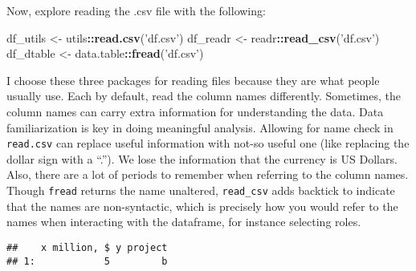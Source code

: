 \documentclass[]{book}
\newenvironment{Shaded}{\begin{snugshade}}{\end{snugshade}}
\newcommand{\DataTypeTok}[1]{\textcolor[rgb]{0.13,0.29,0.53}{#1}}
\newcommand{\DecValTok}[1]{\textcolor[rgb]{0.00,0.00,0.81}{#1}}
\newcommand{\KeywordTok}[1]{\textcolor[rgb]{0.13,0.29,0.53}{\textbf{#1}}}
\newcommand{\NormalTok}[1]{#1}
\newcommand{\OperatorTok}[1]{\textcolor[rgb]{0.81,0.36,0.00}{\textbf{#1}}}
\newcommand{\StringTok}[1]{\textcolor[rgb]{0.31,0.60,0.02}{#1}}
\begin{document}
Now, explore reading the .csv file with the following:

\begin{Shaded}
\begin{Highlighting}[]
\NormalTok{df_utils <-}\StringTok{ }\NormalTok{utils}\OperatorTok{::}\KeywordTok{read.csv}\NormalTok{(}\StringTok{'df.csv'}\NormalTok{)}
\NormalTok{df_readr <-}\StringTok{ }\NormalTok{readr}\OperatorTok{::}\KeywordTok{read_csv}\NormalTok{(}\StringTok{'df.csv'}\NormalTok{)}
\NormalTok{df_dtable <-}\StringTok{ }\NormalTok{data.table}\OperatorTok{::}\KeywordTok{fread}\NormalTok{(}\StringTok{'df.csv'}\NormalTok{)}
\end{Highlighting}
\end{Shaded}

I choose these three packages for reading files because they are what people usually use. Each by default, read the column names differently. Sometimes, the column names can carry extra information for understanding the data. Data familiarization is key in doing meaningful analysis. Allowing for name check in \texttt{read.csv} can replace useful information with not-so useful one (like replacing the dollar sign with a ``.''). We lose the information that the currency is US Dollars. Also, there are a lot of periods to remember when referring to the column names. Though \texttt{fread} returns the name unaltered, \texttt{read\_csv} adds backtick to indicate that the names are non-syntactic, which is precisely how you would refer to the names when interacting with the dataframe, for instance selecting roles.

\begin{Shaded}
\end{Shaded}

\begin{verbatim}
##    x million, $ y project
## 1:            5         b
\end{verbatim}

\begin{Shaded}
\end{Shaded}
\end{document}
